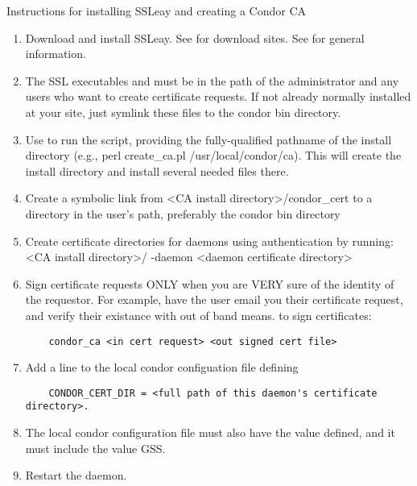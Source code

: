 Instructions for installing SSLeay and creating a Condor CA
\begin{enumerate}
\item Download and install SSLeay. See  for download sites. See  for general information.

\item The SSL executables  and  must be in the path of the administrator and any users who want to create certificate requests. If not already normally installed at your site, just symlink these files to the condor bin directory.

\item Use  to run the  script, providing the fully-qualified pathname of the install directory (e.g., perl create\_ca.pl /usr/local/condor/ca).
This will create the install directory and install several needed files there.

\item Create a symbolic link from <CA install directory>/condor\_cert to a directory in the user's path, preferably the condor bin directory

\item Create certificate directories for daemons using authentication by running: <CA install directory>/ -daemon <daemon certificate directory>

\item Sign certificate requests ONLY when you are VERY sure of the identity
of the requestor. For example, have the user email you their certificate
request, and verify their existance with out of band means.
to sign certificates: 
\begin{verbatim}
	condor_ca <in cert request> <out signed cert file>
\end{verbatim}

\item Add a line to the local condor configuation file defining
\begin{verbatim}
	CONDOR_CERT_DIR = <full path of this daemon's certificate directory>.
\end{verbatim}

\item The local condor configuration file must also have the  value defined, and it must include the value GSS.

\item Restart the daemon.
\end{enumerate}

